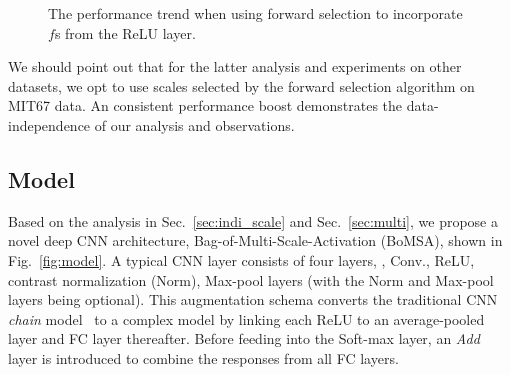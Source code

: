 \documentclass[10pt,twocolumn,letterpaper]{article}
\begin{document}
\begin{figure}[htbp]
\centering
\caption{The performance trend when using forward selection to incorporate $f$s from the ReLU layer. }

\label{fig:forward_select}
\end{figure}

We should point out that for the latter analysis and experiments on other datasets, we opt to use scales selected by the forward selection algorithm on MIT67 data. An consistent performance boost demonstrates the data-independence of our analysis and observations. 

\subsection{Model\label{sec:model}}

Based on the analysis in Sec.~\ref{sec:indi_scale} and Sec.~\ref{sec:multi}, we propose a novel deep CNN architecture, Bag-of-Multi-Scale-Activation (BoMSA), shown in Fig.~\ref{fig:model}. A typical CNN layer consists of four layers, \ie, Conv., ReLU, contrast normalization (Norm), Max-pool layers (with the Norm and Max-pool layers being optional). This augmentation schema converts the traditional CNN \textit{chain} model~\cite{AlexNet,veryDeep} to a complex model by linking each ReLU to an average-pooled layer and FC layer thereafter. Before feeding into the Soft-max layer, an \textit{Add} layer is introduced to combine the responses from all FC layers. 
\end{document}
